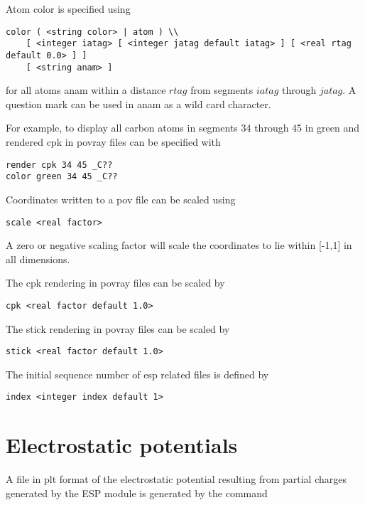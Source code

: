 Atom color is specified using

\begin{verbatim}
color ( <string color> | atom ) \\
    [ <integer iatag> [ <integer jatag default iatag> ] [ <real rtag default 0.0> ] ]
    [ <string anam> ]
\end{verbatim}

for all atoms anam within a distance $rtag$ from segments $iatag$ through $jatag$.
A question mark can be used in anam as a wild card character.
\par
For example, to display all carbon atoms in segments 34 through 45 
in green and rendered cpk in povray files can be specified with

\begin{verbatim}
render cpk 34 45 _C??
color green 34 45 _C??
\end{verbatim}

Coordinates written to a pov file can be scaled using

\begin{verbatim}
scale <real factor>
\end{verbatim}

A zero or negative scaling factor will scale the coordinates to
lie within [-1,1] in all dimensions.
\par
The cpk rendering in povray files can be scaled by

\begin{verbatim}
cpk <real factor default 1.0>
\end{verbatim}
\par

The stick rendering in povray files can be scaled by

\begin{verbatim}
stick <real factor default 1.0>
\end{verbatim}

The initial sequence number of esp related files is defined by

\begin{verbatim}
index <integer index default 1>
\end{verbatim}

\section{Electrostatic potentials}

A file in plt format of the electrostatic potential resulting
from partial charges generated by the ESP module is generated
by the command

